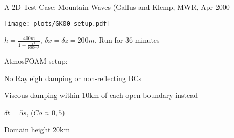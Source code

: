 \begin{slide}
{
    A 2D Test Case: Mountain Waves \normalfont\normalsize
    (Gallus and Klemp, MWR, Apr 2000
}

\begin{center}
\texttt{[image: plots/GK00\_setup.pdf]}

$h = \frac{400m}{1 + \frac{x^2}{1000m^2}}$, $\delta x = \delta z = 200m$, Run for 36 minutes
\end{center}

AtmosFOAM setup:
\begin{list0}
\item No Rayleigh damping or non-reflecting BCs
\item Viscous damping within 10km of each open boundary instead
\item $\delta t = 5s$, ($Co \approx 0,5$)
\item Domain height 20km
\end{list0}

\end{slide}